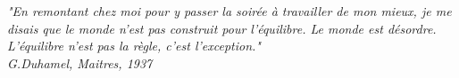 \begin{epigrafe}
    \vspace*{\fill}
	\begin{flushright}
		\textit{"En remontant chez moi pour y passer la soirée à travailler de mon mieux, je me disais que le monde n'est pas construit pour l'équilibre. Le monde est désordre. L'équilibre n'est pas la règle, c'est l'exception."\\
		G.Duhamel, Maitres, 1937}
	\end{flushright}
\end{epigrafe}
